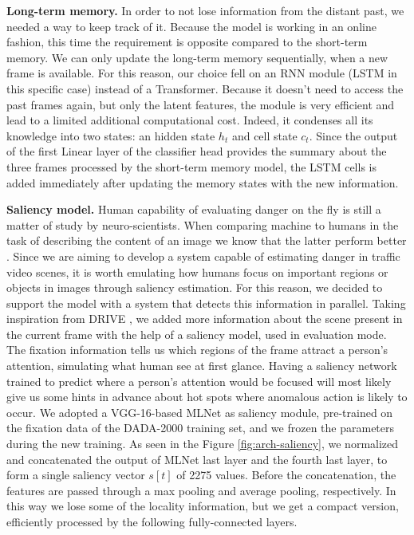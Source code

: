 \noindent\textbf{Long-term memory.}
In order to not lose information from the distant past, we needed a way to keep track of it.
Because the model is working in an online fashion, this time the requirement is opposite compared to the short-term memory.
We can only update the long-term memory sequentially, when a new frame is available.
For this reason, our choice fell on an RNN module (LSTM in this specific case) instead of a Transformer.
Because it doesn't need to access the past frames again, but only the latent features, the module is very efficient and lead to a limited additional computational cost.
Indeed, it condenses all its knowledge into two states: an hidden state $h_t$ and cell state $c_t$.
Since the output of the first Linear layer of the classifier head provides the summary about the three frames processed by the short-term memory model, the LSTM cells is added immediately after updating the memory states with the new information.

\noindent\textbf{Saliency model.}
Human capability of evaluating danger on the fly is still a matter of study by neuro-scientists.
When comparing machine to humans in the task of describing the content of an image we know that the latter perform better \cite{jiang2015salicon}.
Since we are aiming to develop a system capable of estimating danger in traffic video scenes, it is worth emulating how humans focus on important regions or objects in images through saliency estimation.
For this reason, we decided to support the model with a system that detects this information in parallel.
Taking inspiration from DRIVE \cite{bao2021drive}, we added more information about the scene present in the current frame with the help of a saliency model, used in evaluation mode.
The fixation information tells us which regions of the frame attract a person's attention, simulating what human see at first glance.
Having a saliency network trained to predict where a person's attention would be focused will most likely give us some hints in advance about hot spots where anomalous action is likely to occur. 
We adopted a VGG-16-based MLNet \cite{cornia2016deep} as saliency module, pre-trained on the fixation data of the DADA-2000 \cite{fang2019dada} training set, and we frozen the parameters during the new training.
As seen in the Figure \ref{fig:arch-saliency}, we normalized and concatenated the output of MLNet last layer and the fourth last layer, to form a single saliency vector $s[t]$ of 2275 values.
Before the concatenation, the features are passed through a max pooling and average pooling, respectively.
In this way we lose some of the locality information, but we get a compact version, efficiently processed by the following fully-connected layers.

